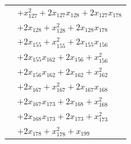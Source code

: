 \begin{longtable}{@{}r@{\;}l@{}}
 & \(\displaystyle +x_{127}^{2} +2x_{127}x_{128} +2x_{127}x_{178}\) \\
 & \(\displaystyle +2x_{128} +x_{128}^{2} +2x_{128}x_{178}\) \\
 & \(\displaystyle +2x_{155} +x_{155}^{2} +2x_{155}x_{156}\) \\
 & \(\displaystyle +2x_{155}x_{162} +2x_{156} +x_{156}^{2}\) \\
 & \(\displaystyle +2x_{156}x_{162} +2x_{162} +x_{162}^{2}\) \\
 & \(\displaystyle +2x_{167} +x_{167}^{2} +2x_{167}x_{168}\) \\
 & \(\displaystyle +2x_{167}x_{173} +2x_{168} +x_{168}^{2}\) \\
 & \(\displaystyle +2x_{168}x_{173} +2x_{173} +x_{173}^{2}\) \\
 & \(\displaystyle +2x_{178} +x_{178}^{2} +x_{199}\) \\[3pt]
\end{longtable}
\endgroup
